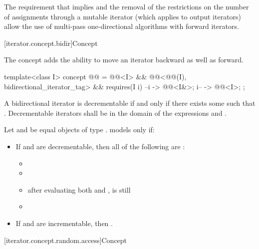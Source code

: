 \pnum
\begin{note}
The requirement that
implies
and the removal of the restrictions on the number of assignments through
a mutable iterator
(which applies to output iterators)
allow the use of multi-pass one-directional algorithms with forward iterators.
\end{note}

[iterator.concept.bidir]{Concept }

\pnum
The  concept adds the ability
to move an iterator backward as well as forward.

\begin{codeblock}
template<class I>
  concept @@ =
    @@<I> &&
    @@<@@(I), bidirectional_iterator_tag> &&
    requires(I i) {
      { --i } -> @@<I&>;
      { i-- } -> @@<I>;
    };
\end{codeblock}

\pnum
A bidirectional iterator  is decrementable if and only if there exists some  such that
. Decrementable iterators  shall be in the domain of the expressions
 and .

\pnum
Let  and  be equal objects of type .
 models  only if:
\begin{itemize}
\item If  and  are decrementable,
  then all of the following are :
  \begin{itemize}
  \item {}
  \item {}
  \item after evaluating both  and ,
     is still 
  \item {}
  \end{itemize}
  \item If  and  are incrementable, then
    .
\end{itemize}

[iterator.concept.random.access]{Concept }

